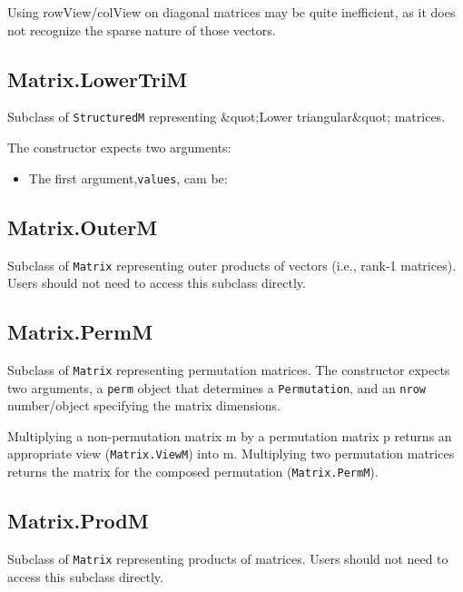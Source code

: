 \documentclass{article}
\begin{document}
Using rowView/colView on diagonal matrices may be quite inefficient,
as it does not recognize the sparse nature of those vectors.


    \subsection*{Matrix.LowerTriM}
    Subclass of \texttt{StructuredM} representing \&quot;Lower triangular\&quot; matrices.


The constructor expects two arguments:


\begin{itemize}

\item The first argument,\texttt{values}, cam be:


\end{itemize}

    \subsection*{Matrix.OuterM}
    Subclass of \texttt{Matrix} representing outer products of vectors (i.e., rank-1
matrices).  Users should not need to access this subclass directly.


    \subsection*{Matrix.PermM}
    Subclass of \texttt{Matrix} representing permutation matrices. The constructor expects two
arguments, a \texttt{perm} object that determines a \texttt{Permutation}, and an \texttt{nrow} number/object
specifying the matrix dimensions.


Multiplying a non-permutation matrix m by a permutation matrix p
returns an appropriate view (\texttt{Matrix.ViewM}) into m.  Multiplying two permutation
matrices returns the matrix for the composed permutation (\texttt{Matrix.PermM}).


    \subsection*{Matrix.ProdM}
    Subclass of \texttt{Matrix} representing products of matrices.
Users should not need to access this subclass directly.
\end{document}
